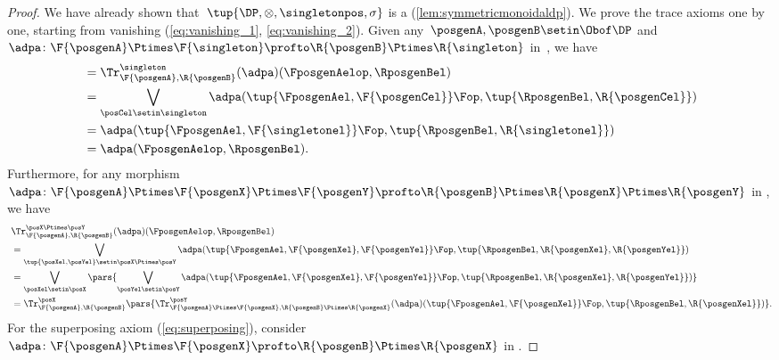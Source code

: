 \begin{proof}
    We have already shown that~$\tup{\DP,{{\otimes}},\singletonpos,\sigma}$ is a  (\cref{lem:symmetricmonoidaldp}).
    We prove the trace axioms one by one, starting from vanishing (\cref{eq:vanishing_1}, \cref{eq:vanishing_2}).
    Given any~$\posgenA,\posgenB\setin \Obof\DP$ and~$\adpa\colon \F{\posgenA}\Ptimes \F{\singleton}\profto \R{\posgenB}\Ptimes \R{\singleton}$ in~\DP, we have
    \begin{equation}
        \begin{aligned}
             & = \Tr_{\F{\posgenA},\R{\posgenB}}^{\singleton}(\adpa)(\FposgenAelop,\RposgenBel) \\
             & =\bigvee_{\posCel\setin \singleton}\adpa(\tup{\FposgenAel,\F{\posgenCel}}\Fop, \tup{\RposgenBel,\R{\posgenCel}}) \\
             & =\adpa(\tup{\FposgenAel,\F{\singletonel}}\Fop, \tup{\RposgenBel,\R{\singletonel}}) \\
             & =\adpa(\FposgenAelop,\RposgenBel).
        \end{aligned}
    \end{equation}
    Furthermore, for any morphism~$\adpa\colon \F{\posgenA}\Ptimes \F{\posgenX}\Ptimes \F{\posgenY} \profto \R{\posgenB}\Ptimes \R{\posgenX} \Ptimes \R{\posgenY}$ in \DP, we have
    \begin{equation}
        \begin{aligned}
            ~ & \Tr_{\F{\posgenA},\R{\posgenB}}^{\posX\Ptimes\posY}(\adpa)(\FposgenAelop,\RposgenBel) \\
              & = \bigvee_{\tup{\posXel,\posYel} \setin \posX\Ptimes \posY} \adpa(\tup{\FposgenAel,\F{\posgenXel},\F{\posgenYel}}\Fop, \tup{\RposgenBel,\R{\posgenXel},\R{\posgenYel}}) \\
              & =\bigvee_{\posXel \setin \posX}\pars{\bigvee_{\posYel \setin \posY} \adpa(\tup{\FposgenAel,\F{\posgenXel},\F{\posgenYel}}\Fop, \tup{\RposgenBel,\R{\posgenXel},\R{\posgenYel}})} \\
              & =\Tr_{\F{\posgenA},\R{\posgenB}}^\posX\pars{
                \Tr_{\F{\posgenA}\Ptimes \F{\posgenX},\R{\posgenB}\Ptimes \R{\posgenX}}^\posY(\adpa)(\tup{\FposgenAel,\F{\posgenXel}}\Fop, \tup{\RposgenBel,\R{\posgenXel}})}.
        \end{aligned}
    \end{equation}
    For the superposing axiom (\cref{eq:superposing}), consider~$\adpa\colon \F{\posgenA}\Ptimes \F{\posgenX}\profto \R{\posgenB}\Ptimes \R{\posgenX}$ in \DP.

\end{proof}
